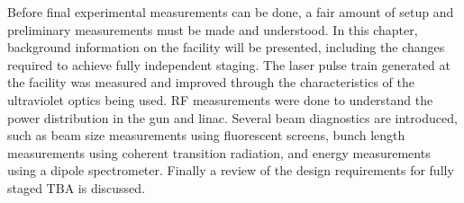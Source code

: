 \label{chp:exp}


Before final experimental measurements can be done, 
a fair amount of setup and preliminary measurements must be made and understood. 
In this chapter, background information on the facility will be presented, 
including the changes required  to achieve fully independent staging.
The laser pulse train generated at the facility was measured and improved 
through the characteristics of the ultraviolet optics being used. 
RF measurements were done to understand the power distribution in the gun and linac.
Several beam diagnostics are introduced, such as beam size measurements using 
fluorescent screens, bunch length measurements using coherent transition radiation, 
and energy measurements using a dipole spectrometer. 
Finally a review of the design requirements for fully staged TBA is discussed.

 \label{sec:facility}

